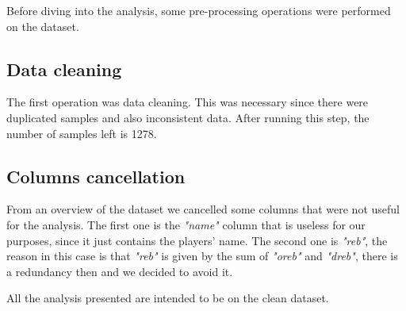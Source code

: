 Before diving into the analysis, some pre-processing operations were performed on the dataset.

\subsection{Data cleaning}
The first operation was data cleaning. This was necessary since there were duplicated samples and also inconsistent data.
After running this step, the number of samples left is 1278.

\subsection{Columns cancellation}
From an overview of the dataset we cancelled some columns that were not useful for the analysis.
The first one is the \textit{"name"} column that is useless for our purposes, since it just contains the players' name.
The second one is \textit{"reb"}, the reason in this case is that \textit{"reb"} is given by the sum of \textit{"oreb"} and \textit{"dreb"}, there is a redundancy then and we decided to avoid it.
 
\noindent
All the analysis presented are intended to be on the clean dataset.